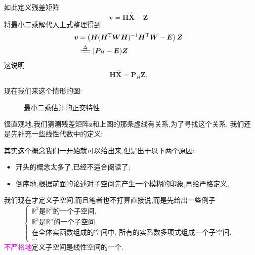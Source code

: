 \documentclass[cn,10pt,citestyle=gb7714-2015,bibstyle=gb7714-2015]{elegantbook}
\begin{document}
    \begin{definition}[残差矩阵]
        如此定义残差矩阵
        \[
            \bm{v}=\bm{H}\hat{\bm{X}}-\bm{Z}  
        \]
        将最小二乘解代入上式整理得到
        \begin{align*}
            \bm{v}&=\left(\bm{H}(\bm{H}^\mathrm{T}\bm{W}\bm{H})^{-1}\bm{H}^\mathrm{T}\bm{W}-\bm{E}\right)\bm{Z}\\
            &\xlongequal{\Delta}(\bm{P}_H-\bm{E})\bm{Z}
          \end{align*}
          这说明
        \[
            \bm{H}\hat{\bm{X}}=\bm{P}_{H}\bm{Z}.
        \]
    \end{definition}
    现在我们来这个情形的图:
    \begin{figure}[H]
        \centering
        \caption{最小二乘估计的正交特性}
    \end{figure}
    很直观地,我们猜测残差矩阵$\bm{z}$和上图的那条虚线有关系,为了寻找这个关系,
    我们还是先补充一些线性代数中的定义:
    \begin{definition}[子空间]
        其实这个概念我们一开始就可以给出来,但是出于以下两个原因:
        \begin{itemize}
            \item[\HandRight] 开头的概念太多了,已经不适合阅读了;
            \item[\HandRight] 倒序地,根据前面的论述对子空间先产生一个模糊的印象,再给严格定义,
        \end{itemize}
        我们现在才定义子空间.而且笔者也不打算直接说,而是先给出一些例子
        \[
            \begin{cases}
                \mathbb{R}^2\text{是}\mathbb{R}^3\text{的一个子空间},\\
                \mathbb{R}^3\text{是}\mathbb{R}^n\text{的一个子空间},\\
                \text{在全体实函数组成的空间中, 所有的实系数多项式组成一个子空间},\\
                \ldots
            \end{cases}  
        \]
        \textcolor{magenta}{不严格地}定义子空间是线性空间的一个.
    \end{definition}
\end{document}

